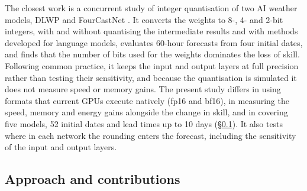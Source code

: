  The
closest work is a concurrent study of integer quantisation of two AI
weather models, DLWP and FourCastNet \citep{bhattacharya2026ptq}. It
converts the weights to 8-, 4- and 2-bit integers, with and without
quantising the intermediate results and with methods developed for
language models, evaluates 60-hour forecasts from four initial dates,
and finds that the number of bits used for the weights dominates the
loss of skill. Following common practice, it keeps the input and output
layers at full precision rather than testing their sensitivity, and
because the quantisation is simulated it does not measure speed or
memory gains. The present study differs in using formats that
current GPUs execute natively (fp16 and bf16), in measuring the speed,
memory and energy gains alongside the change in skill, and in covering
five models, 52 initial dates and lead times up to 10 days
(\S\ref{sec:intro-contributions}). It also tests where in each network
the rounding enters the forecast, including the sensitivity of the input
and output layers.

\subsection{Approach and contributions}
\label{sec:intro-contributions}

